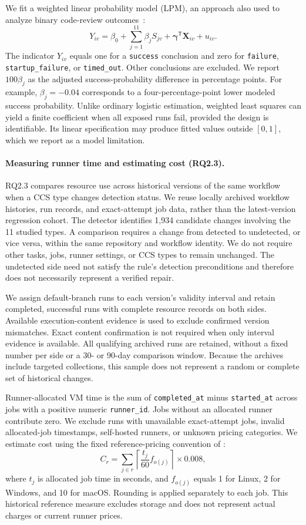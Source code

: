 \documentclass[smallextended]{svjour3}
\begin{document}
We fit a weighted linear probability model (LPM), an approach also used to analyze binary code-review outcomes~\citep{murphyhill2023systemic}:
\[
Y_{iv} = \beta_0 + \sum_{j=1}^{11}\beta_j S_{jv} + \boldsymbol{\gamma}^{\mathsf{T}}\mathbf{X}_{iv} + u_{iv}.
\]
The indicator $Y_{iv}$ equals one for a \texttt{success} conclusion and zero for \texttt{failure}, \texttt{startup\_failure}, or \texttt{timed\_out}. Other conclusions are excluded. We report $100\beta_j$ as the adjusted success-probability difference in percentage points. For example, $\beta_j=-0.04$ corresponds to a four-percentage-point lower modeled success probability. Unlike ordinary logistic estimation, weighted least squares can yield a finite coefficient when all exposed runs fail, provided the design is identifiable. Its linear specification may produce fitted values outside $[0,1]$, which we report as a model limitation.

\paragraph{Measuring runner time and estimating cost (RQ2.3).}

RQ2.3 compares resource use across historical versions of the same workflow when a CCS type changes detection status. We reuse locally archived workflow histories, run records, and exact-attempt job data, rather than the latest-version regression cohort. The detector identifies 1,934 candidate changes involving the 11 studied types. A comparison requires a change from detected to undetected, or vice versa, within the same repository and workflow identity. We do not require other tasks, jobs, runner settings, or CCS types to remain unchanged. The undetected side need not satisfy the rule's detection preconditions and therefore does not necessarily represent a verified repair.

We assign default-branch runs to each version's validity interval and retain completed, successful runs with complete resource records on both sides. Available execution-content evidence is used to exclude confirmed version mismatches. Exact content confirmation is not required when only interval evidence is available. All qualifying archived runs are retained, without a fixed number per side or a 30- or 90-day comparison window. Because the archives include targeted collections, this sample does not represent a random or complete set of historical changes.

Runner-allocated VM time is the sum of \texttt{completed\_at} minus \texttt{started\_at} across jobs with a positive numeric \texttt{runner\_id}. Jobs without an allocated runner contribute zero. We exclude runs with unavailable exact-attempt jobs, invalid allocated-job timestamps, self-hosted runners, or unknown pricing categories. We estimate cost using the fixed reference-pricing convention of \citet{bouzenia2024resource}:
\[
C_r=\sum_{j\in r}\left\lceil \frac{t_j}{60}f_{o(j)}\right\rceil \times 0.008,
\]
where $t_j$ is allocated job time in seconds, and $f_{o(j)}$ equals 1 for Linux, 2 for Windows, and 10 for macOS. Rounding is applied separately to each job. This historical reference measure excludes storage and does not represent actual charges or current runner prices.
\end{document}
